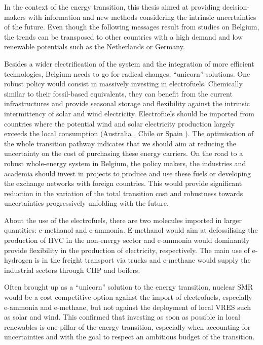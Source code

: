 In the context of the energy transition, this thesis aimed at providing decision-makers with information and new methods considering the intrinsic uncertainties of the future. Even though the following messages result from studies on Belgium, the trends can be transposed to other countries with a high demand and low renewable potentials such as the Netherlands or Germany. 

Besides a wider electrification of the system and the integration of more efficient technologies, Belgium needs to go for radical changes, ``unicorn'' solutions. One robust policy would consist in massively investing in electrofuels. Chemically similar to their fossil-based equivalents, they can benefit from the current infrastructures and provide seasonal storage and flexibility against the intrinsic intermittency of solar and wind electricity. Electrofuels should be imported from countries where the potential wind and solar electricity production largely exceeds the local consumption (Australia \cite{Australia_efuels}, Chile \cite{Chile_efuels} or Spain \cite{Spain_efuels}). The optimisation of the whole transition pathway indicates that we should aim at reducing the uncertainty on the cost of purchasing these energy carriers. On the road to a robust whole-energy system in Belgium, the policy makers, the industries and academia should invest in projects to produce and use these fuels or developing the exchange networks with foreign countries. This would provide significant reduction in the variation of the total transition cost and robustness towards uncertainties progressively unfolding with the future. 

About the use of the electrofuels, there are two molecules imported in larger quantities: e-methanol and e-ammonia. E-methanol would aim at defossilising the production of \acrfull{HVC} in the non-energy sector and e-ammonia would dominantly provide flexibility in the production of electricity, respectively. The main use of e-hydrogen is in the freight transport via trucks and e-methane would supply the industrial sectors through \gls{CHP} and boilers.

Often brought up as a ``unicorn'' solution to the energy transition, nuclear \gls{SMR} would be a cost-competitive option against the import of electrofuels, especially e-ammonia and e-methane, but not against the deployment of local \acrfull{VRES} such as solar and wind. This confirmed that investing as soon as possible in local renewables is one pillar of the energy transition, especially when accounting for uncertainties and with the goal to respect an ambitious  budget of the transition. 

